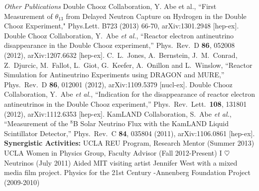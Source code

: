 \newline\newline\noindent
{\it Other Publications}
\newline\noindent
Double Chooz Collaboration, Y. Abe et al., ``First Measurement of $\theta_{13}$ from Delayed Neutron Capture on Hydrogen in the Double Chooz Experiment," Phys.Lett. B723 (2013) 66-70, arXiv:1301.2948 [hep-ex].
\newline\newline\noindent
Double Chooz Collaboration, Y.~Abe {\it et al.}, ``Reactor electron antineutrino disappearance in the Double Chooz experiment,'' Phys.\ Rev.\ D {\bf 86}, 052008 (2012), arXiv:1207.6632 [hep-ex]. 
\newline\newline\noindent
C.~L.~Jones, A.~Bernstein, J.~M.~Conrad, Z.~Djurcic, M.~Fallot, L.~Giot, G.~Keefer, A.~Onillon and L.~Winslow, ``Reactor Simulation for Antineutrino Experiments using DRAGON and MURE,'' Phys.\ Rev.\ D {\bf 86}, 012001 (2012), arXiv:1109.5379 [nucl-ex].
\newline\newline \noindent
Double Chooz Collaboration, Y.~Abe {\it et al.}, ``Indication for the disappearance of reactor electron antineutrinos in the Double Chooz experiment,'' Phys.\ Rev.\ Lett.\  {\bf 108}, 131801 (2012), arXiv:1112.6353 [hep-ex].
\newline\newline \noindent
KamLAND Collaboration, S.~Abe {\it et al.}, ``Measurement of the $^8$B Solar Neutrino Flux with the KamLAND Liquid Scintillator Detector,'' Phys.\ Rev.\ C {\bf 84}, 035804 (2011), arXiv:1106.0861 [hep-ex].
\newline\newline \noindent
{\bf Synergistic Activities:}
\newline \noindent
UCLA REU Program, Research Mentor (Summer 2013)
\newline\newline\noindent
UCLA Women in Physics Group, Faculty Advisor (Fall 2012-Present)
\newline\newline \noindent
I $\heartsuit$ Neutrinos  (July 2011)
\newline \noindent
Aided MIT visiting artist Jennifer West with a mixed media film project.
\newline\newline \noindent
Physics for the 21st Century -Annenberg Foundation Project (2009-2010)
\newline \noindent
